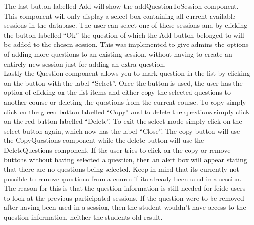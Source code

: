 The last button labelled Add will show the addQuestionToSession component. This component will only display a select box containing all current available sessions in the database. The user can select one of these sessions and by clicking the button labelled “Ok” the question of which the Add button belonged to will be added to the chosen session. This was implemented to give admins the options of adding more questions to an existing session, without having to create an entirely new session just for adding an extra question.\\[11pt]
Lastly the Question component allows you to mark question in the list by clicking on the button with the label “Select”. Once the button is used, the user has the option of clicking on the list items and either copy the selected questions to another course or deleting the questions from the current course. To copy simply click on the green button labelled “Copy” and to delete the questions simply click on the red button labelled “Delete”. To exit the select mode simply click on the select button again, which now has the label “Close”. The copy button will use the CopyQuestions component while the delete button will use the DeleteQuestions component. If the user tries to click on the copy or remove buttons without having selected a question, then an alert box will appear stating that there are no questions being selected. Keep in mind that its currently not possible to remove questions from a course if its already been used in a session. The reason for this is that the question information is still needed for feide users to look at the previous participated sessions. If the question were to be removed after having been used in a session, then the student wouldn't have access to the question information, neither the students old result. \\[11pt]
